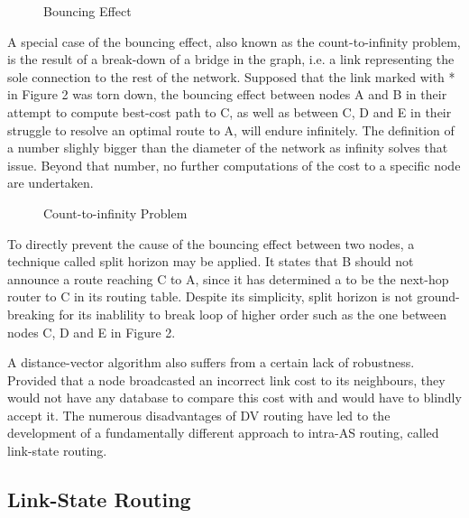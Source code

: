 \documentclass{acm_proc_article-sp}
\begin{document}
\begin{figure}
\centering
{}
\caption{Bouncing Effect}
\end{figure}

A special case of the bouncing effect, also known as the count-to-infinity problem, is the result of a break-down of a bridge in the graph, i.e. a link representing the sole connection to the rest of the network. Supposed that the link marked with * in Figure 2 was torn down, the bouncing effect between nodes A and B in their attempt to compute best-cost path to C, as well as between C, D and E in their struggle to resolve an optimal route to A, will endure infinitely. The definition of a number slighly bigger than the diameter of the network as infinity solves that issue. Beyond that number, no further computations of the cost to a specific node are undertaken. 

\begin{figure}
\centering
{}
\caption{Count-to-infinity Problem}
\end{figure}

To directly prevent the cause of the bouncing effect between two nodes, a technique called split horizon may be applied. It states that B should not announce a route reaching C to A, since it has determined a to be the next-hop router to C in its routing table. Despite its simplicity, split horizon is not ground-breaking for its inablility to break loop of higher order such as the one between nodes C, D and E in Figure 2.  

A distance-vector algorithm also suffers from a certain lack of robustness. Provided that a node broadcasted an incorrect link cost to its neighbours, they would not have any database to compare this cost with and would have to blindly accept it. The numerous disadvantages of DV routing have led to the development of a fundamentally different approach to intra-AS routing, called link-state routing.

\subsection{Link-State Routing}
\end{document}
